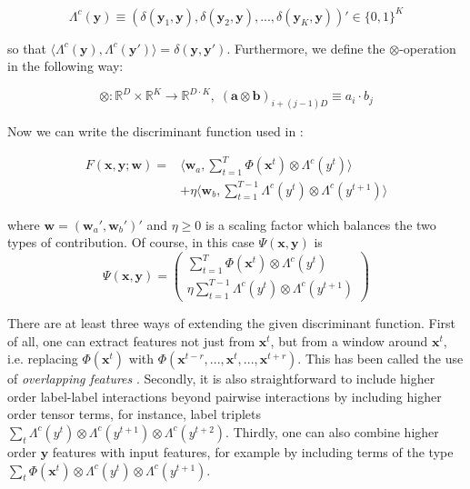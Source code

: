 \begin{equation}
\Lambda^c(\mathbf{y}) \equiv (\delta(\mathbf{y}_1,\mathbf{y}),\delta(\mathbf{y}_2,\mathbf{y}),...,\delta(\mathbf{y}_K,\mathbf{y}))' \in \{0,1\}^K
\end{equation}

so that $\langle \Lambda^c(\mathbf{y}),\Lambda^c(\mathbf{y}')\rangle =\delta(\mathbf{y},\mathbf{y}')$. Furthermore, we define the $\otimes$-operation in the following way:

\begin{equation}
\otimes:\mathbb{R}^D \times \mathbb{R}^K \rightarrow \mathbb{R}^{D\cdot K},\; (\mathbf{a}\otimes\mathbf{b})_{i+(j-1)D} \equiv a_i \cdot b_j
\end{equation}

Now we can write the discriminant function used in \cite{tsochantaridis2005large}:

\begin{eqnarray}
F(\mathbf{x},\mathbf{y};\mathbf{w}) = & \langle \mathbf{w}_a,\sum_{t=1}^T \Phi(\mathbf{x}^t) \otimes \Lambda^c(y^t) \rangle \nonumber \\
 & +\eta \langle \mathbf{w}_b,\sum_{t=1}^{T-1}  \Lambda^c(y^{t}) \otimes \Lambda^c(y^{t+1}) \rangle
\end{eqnarray}

where $\mathbf{w} = (\mathbf{w}_a',\mathbf{w}_b')'$ and $\eta \geq 0$ is a scaling factor which balances the two types of contribution. Of course, in this case $\Psi(\mathbf{x},\mathbf{y})$ is
\begin{equation}
\Psi(\mathbf{x},\mathbf{y}) = \left( \begin{array}{cc} \sum_{t=1}^T \Phi(\mathbf{x}^t) \otimes \Lambda^c(y^t) \\ \eta\sum_{t=1}^{T-1}  \Lambda^c(y^{t}) \otimes \Lambda^c(y^{t+1}) \end{array} \right)
\end{equation}

There are at least three ways of extending the given discriminant function. First of all, one can extract features not just from $\mathbf{x}^t$, but from a window around $\mathbf{x}^t$, i.e. replacing $\Phi(\mathbf{x}^t)$ with $\Phi(\mathbf{x}^{t-r},...,\mathbf{x}^t,...,\mathbf{x}^{t+r})$. This has been called the use of \textit{overlapping features} \cite{altun2003hidden}. Secondly, it is also straightforward to include higher order label-label interactions beyond pairwise interactions by including higher order tensor terms, for instance, label triplets $\sum_{t}  \Lambda^c(y^{t}) \otimes \Lambda^c(y^{t+1}) \otimes \Lambda^c(y^{t+2})$. Thirdly, one can also combine higher order $\mathbf{y}$ features with input features, for example by including terms of the type $\sum_{t} \Phi(\mathbf{x}^t) \otimes \Lambda^c(y^t) \otimes \Lambda^c(y^{t+1})$. 

